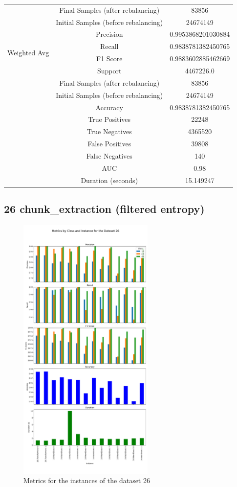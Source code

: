 \begin{longtable}{|c|c|c|}
 & Final Samples (after rebalancing) & 83856 \\
 & Initial Samples (before rebalancing) & 24674149 \\
\hline
\multirow{4}{*}{Weighted Avg} & Precision & 0.9953868201030884 \\
 & Recall & 0.9838781382450765 \\
 & F1 Score & 0.9883602885462669 \\
 & Support & 4467226.0 \\
 & Final Samples (after rebalancing) & 83856 \\
 & Initial Samples (before rebalancing) & 24674149 \\
\hline
& Accuracy & 0.9838781382450765 \\ \hline
& True Positives & 22248 \\ \hline
& True Negatives & 4365520 \\ \hline
& False Positives & 39808 \\ \hline
& False Negatives & 140 \\ \hline
& AUC & 0.98 \\ \hline
& Duration (seconds) & 15.149247 \\ \hline
\end{longtable}


\subsection{26 chunk\_extraction (filtered entropy)}

\begin{figure}[H]
\centering
\includegraphics[width=0.6\textwidth]{img/annexes/26/26 - Metrics.png}
\caption{Metrics for the instances of the dataset 26}
\label{fig:26_metrics_instance}
\end{figure}

